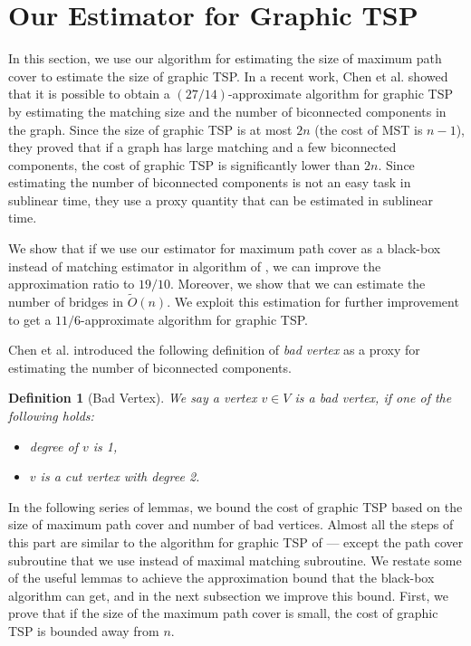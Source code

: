 \documentclass[letterpaper,11pt]{article}
\newtheorem{definition}[theorem]{Definition}
\begin{document}
\section{Our Estimator for Graphic TSP}\label{sec:graphic-TSP-minor}
In this section, we use our algorithm for estimating the size of maximum path cover to estimate the size of graphic TSP. In a recent work, Chen et al. \cite{chen2020} showed that it is possible to obtain a $(27/14)$-approximate algorithm for graphic TSP by estimating the matching size and the number of biconnected components in the graph. Since the size of graphic TSP is at most $2n$ (the cost of MST is $n-1$), they proved that if a graph has large matching and a few biconnected components, the cost of graphic TSP is significantly lower than $2n$. Since estimating the number of biconnected components is not an easy task in sublinear time, they use a proxy quantity that can be estimated in sublinear time.

We show that if we use our estimator for maximum path cover as a black-box instead of matching estimator in algorithm of \cite{chen2020}, we can improve the approximation ratio to $19/10$. Moreover, we show that we can estimate the number of bridges in $\tilde{O}(n)$. We exploit this estimation for further improvement to get a $11/6$-approximate algorithm for graphic TSP. 

Chen et al. \cite{chen2020} introduced the following definition of {\em bad vertex} as a proxy for estimating the number of biconnected components.

\begin{definition}[Bad Vertex]
We say a vertex $v \in V$ is a bad vertex, if one of the following holds:
\begin{itemize}
    \item degree of $v$ is 1,
    \item $v$ is a cut vertex with degree 2.
\end{itemize}
\end{definition}


In the following series of lemmas, we bound the cost of graphic TSP based on the size of maximum path cover and number of bad vertices. Almost all the steps of this part are similar to the algorithm for graphic TSP of \cite{chen2020} --- except the path cover subroutine that we use instead of maximal matching subroutine. We restate some of the useful lemmas to achieve the approximation bound that the black-box algorithm can get, and in the next subsection we improve this bound. First, we prove that if the size of the maximum path cover is small, the cost of graphic TSP is bounded away from $n$.
\end{document}
